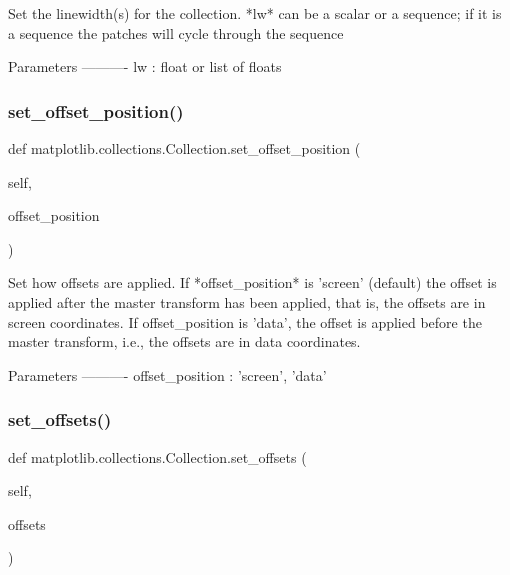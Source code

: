 \begin{DoxyVerb}Set the linewidth(s) for the collection.  *lw* can be a scalar
or a sequence; if it is a sequence the patches will cycle
through the sequence

Parameters
----------
lw : float or list of floats
\end{DoxyVerb}
 \mbox{\label{classmatplotlib_1_1collections_1_1Collection_a832e5bad2036b7887b08fe544e213836}} 
\subsubsection{\texorpdfstring{set\+\_\+offset\+\_\+position()}{set\_offset\_position()}}
{\footnotesize\ttfamily def matplotlib.\+collections.\+Collection.\+set\+\_\+offset\+\_\+position (\begin{DoxyParamCaption}\item[{}]{self,  }\item[{}]{offset\+\_\+position }\end{DoxyParamCaption})}

\begin{DoxyVerb}Set how offsets are applied.  If *offset_position* is 'screen'
(default) the offset is applied after the master transform has
been applied, that is, the offsets are in screen coordinates.
If offset_position is 'data', the offset is applied before the
master transform, i.e., the offsets are in data coordinates.

Parameters
----------
offset_position : {'screen', 'data'}
\end{DoxyVerb}
 \mbox{\label{classmatplotlib_1_1collections_1_1Collection_ac88ffe0504f0b580f20d4adb7f324977}} 
\subsubsection{\texorpdfstring{set\+\_\+offsets()}{set\_offsets()}}
{\footnotesize\ttfamily def matplotlib.\+collections.\+Collection.\+set\+\_\+offsets (\begin{DoxyParamCaption}\item[{}]{self,  }\item[{}]{offsets }\end{DoxyParamCaption})}

